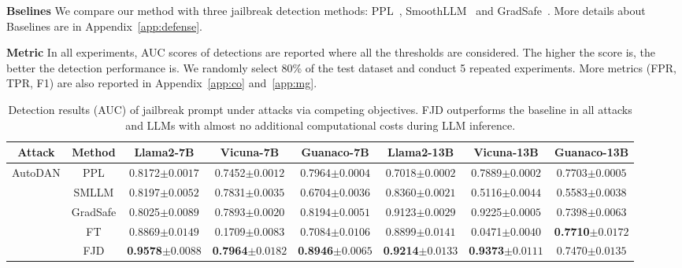 \documentclass{article}
\begin{document}
\textbf{Bselines} We compare our method with three jailbreak detection methods: PPL~\citep{alon2023detecting}, SmoothLLM~\citep{robey2023smoothllm} and GradSafe~\citep{xie2024gradsafe}. More details about Baselines are in Appendix~\ref{app:defense}.

\textbf{Metric} In all experiments, AUC scores of detections are reported where all the thresholds are considered. The higher the score is, the better the detection performance is. We randomly select 80\% of the test dataset and conduct 5 repeated experiments. More metrics (FPR, TPR, F1) are also reported in Appendix~\ref{app:co} and~\ref{app:mg}.

\begin{table}[t]
    \centering
  
    \caption{Detection results (AUC) of jailbreak prompt under attacks via competing objectives. FJD outperforms the baseline in all attacks and LLMs with almost no additional computational costs during LLM inference.}

    \setlength\tabcolsep{8pt}
    \scriptsize
    \begin{tabular}{cccccccc}
        \toprule
        \textbf{Attack} & \textbf{Method} & \textbf{Llama2-7B} &  \textbf{Vicuna-7B} &  \textbf{Guanaco-7B} & \textbf{Llama2-13B} &  \textbf{Vicuna-13B} &  \textbf{Guanaco-13B} \\
        \midrule

        \multirow{4}{*}{AutoDAN}
        & PPL & 0.8172\tiny{$\pm 0.0017$} & 0.7452\tiny{$\pm 0.0012$} & 0.7964\tiny{$\pm 0.0004$}& 0.7018\tiny{$\pm 0.0002$} & 0.7889\tiny{$\pm 0.0002$} & 0.7703\tiny{$\pm 0.0005$} \\
        & SMLLM & 0.8197\tiny{$\pm 0.0052$} & 0.7831\tiny{$\pm 0.0035$} & 0.6704\tiny{$\pm 0.0036$}& 0.8360\tiny{$\pm 0.0021$} & 0.5116\tiny{$\pm 0.0044$} & 0.5583\tiny{$\pm 0.0038$} \\
        & GradSafe & 0.8025\tiny{$\pm 0.0089$} & 0.7893\tiny{$\pm 0.0020$} & 0.8194\tiny{$\pm 0.0051$} & 0.9123\tiny{$\pm 0.0029$} & 0.9225\tiny{$\pm 0.0005$} & 0.7398\tiny{$\pm 0.0063$} \\
        & FT & 0.8869\tiny{$\pm 0.0149$} & 0.1709\tiny{$\pm 0.0083$} & 0.7084\tiny{$\pm 0.0106$} & 0.8899\tiny{$\pm 0.0141$} & 0.0471\tiny{$\pm 0.0040$} & \textbf{0.7710}\tiny{$\pm 0.0172$} \\
       \rowcolor{lightgray} & FJD & \textbf{0.9578}\tiny{$\pm 0.0088$} & \textbf{0.7964}\tiny{$\pm 0.0182$} & \textbf{0.8946}\tiny{$\pm 0.0065$}& \textbf{0.9214}\tiny{$\pm 0.0133$} & \textbf{0.9373}\tiny{$\pm 0.0111$} & 0.7470\tiny{$\pm 0.0135$}  \\
        \midrule
        

\end{tabular}
\end{table}
\end{document}
